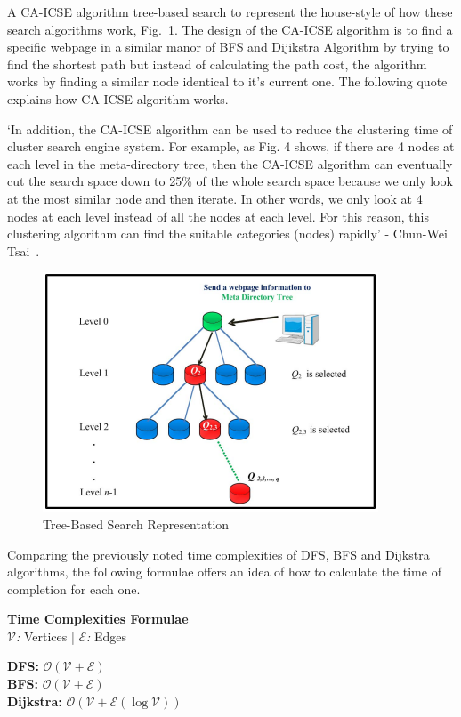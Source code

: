 \documentclass[conference]{IEEEtran}
\begin{document}
      A CA-ICSE algorithm tree-based search to represent the house-style of how these search algorithms work, Fig.~\ref{fig:treeBasedSearch}. The design of the  CA-ICSE algorithm is to find a specific webpage in a similar manor of BFS and Dijikstra Algorithm by trying to find the shortest path but instead of calculating the path cost, the algorithm works by finding a similar node identical to it's current one. The following quote explains how CA-ICSE algorithm works.
      
      \begin{center}
        `In addition, the CA-ICSE algorithm can be used to reduce the clustering time of cluster search engine system. For example, as Fig. 4 shows, if there are 4 nodes at each level in the meta-directory tree, then the CA-ICSE algorithm can eventually cut the search space down to 25\% of the whole search space because we only look at the most similar node and then iterate. In other words, we only look at 4 nodes at each level instead of all the nodes at each level. For this reason, this clustering algorithm can find the suitable categories (nodes) rapidly' - Chun-Wei Tsai~\cite{tsai_fast_2009}.
      \end{center}
      \begin{figure}[ht]
        \centering
        \includegraphics[width=0.65\columnwidth]{Figures/fig6.png}
        \caption{Tree-Based Search Representation}
        \label{fig:treeBasedSearch}
      \end{figure}

      Comparing the previously noted time complexities of DFS, BFS and Dijkstra algorithms, the following formulae offers an idea of how to calculate the time of completion for each one.
      \begin{center}
        \textbf{Time Complexities Formulae}\\
        \textit{$\mathcal{V}$:} Vertices | \textit{$\mathcal{E}$:} Edges

        \textbf{DFS:} $\mathcal{O}(\mathcal{V} + \mathcal{E})$\\
        \textbf{BFS:} $\mathcal{O}(\mathcal{V} + \mathcal{E})$\\
        \textbf{Dijkstra:} $\mathcal{O}(\mathcal{V} + \mathcal{E}(\log\mathcal{V}))$
      \end{center}
\end{document}
